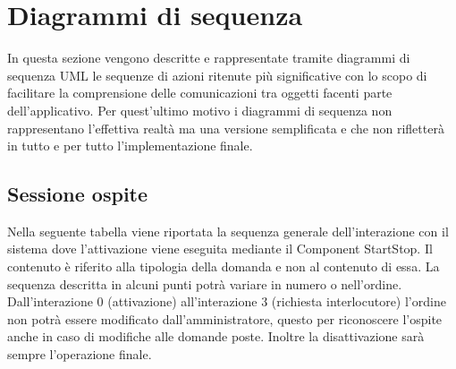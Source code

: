 \documentclass[../DefinizioneDiProdotto_v2.0.0.tex]{subfiles}
\begin{document}
\section{Diagrammi di sequenza}
In questa sezione vengono descritte e rappresentate tramite diagrammi di sequenza UML le sequenze di azioni ritenute più significative con lo scopo di facilitare la comprensione delle comunicazioni tra oggetti facenti parte dell'applicativo. Per quest'ultimo motivo i diagrammi di sequenza non rappresentano l'effettiva realtà ma una versione semplificata e che non rifletterà in tutto e per tutto l'implementazione finale.

\subsection{Sessione ospite}
Nella seguente tabella viene riportata la sequenza generale dell'interazione con il sistema dove l'attivazione viene eseguita mediante il Component StartStop. Il contenuto è riferito alla tipologia della domanda e non al contenuto di essa. La sequenza descritta in alcuni punti potrà variare in numero o nell'ordine. Dall'interazione 0 (attivazione) all'interazione 3 (richiesta interlocutore) l'ordine non potrà essere modificato dall'amministratore, questo per riconoscere l'ospite anche in caso di modifiche alle domande poste. Inoltre la disattivazione sarà sempre l'operazione finale.
\end{document}
